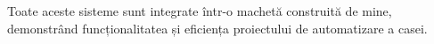 Toate aceste sisteme sunt integrate într-o machetă construită de mine, demonstrând funcționalitatea și eficiența proiectului de automatizare a casei.



\vfill
